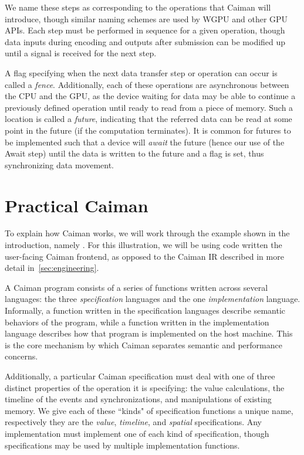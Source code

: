We name these steps as corresponding to the operations that Caiman will introduce, though similar naming schemes are used by WGPU and other GPU APIs.  Each step must be performed in sequence for a given operation, though data inputs during encoding and outputs after submission can be modified up until a signal is received for the next step.

A flag specifying when the next data transfer step or operation can occur is called a \emph{fence}.  Additionally, each of these operations are asynchronous between the CPU and the GPU, as the device waiting for data may be able to continue a previously defined operation until ready to read from a piece of memory.  Such a location is called a \emph{future}, indicating that the referred data can be read at some point in the future (if the computation terminates).  It is common for futures to be implemented such that a device will \emph{await} the future (hence our use of the Await step) until the data is written to the future and a flag is set, thus synchronizing data movement.

\section{Practical Caiman}
\label{sec:practical}

To explain how Caiman works, we will work through the example shown in the introduction, namely .  For this illustration, we will be using code written the user-facing Caiman frontend, as opposed to the Caiman IR described in more detail in~\ref{sec:engineering}.

A Caiman program consists of a series of functions written across several languages: the three \textit{specification} languages and the one \textit{implementation} language.  Informally, a function written in the specification languages describe semantic behaviors of the program, while a function written in the implementation language describes how that program is implemented on the host machine.  This is the core mechanism by which Caiman separates semantic and performance concerns.

Additionally, a particular Caiman specification must deal with one of three distinct properties of the operation it is specifying: the value calculations, the timeline of the events and synchronizations, and manipulations of existing memory.  We give each of these ``kinds" of specification functions a unique name, respectively they are the \textit{value}, \textit{timeline}, and \textit{spatial} specifications.  Any implementation must implement one of each kind of specification, though specifications may be used by multiple implementation functions.

